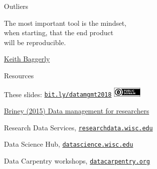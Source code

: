 \documentclass[aspectratio=169,12pt,t]{beamer}
\begin{document}
\begin{frame}[c]{Outliers}


\end{frame}




\begin{frame}[c]{}

\begin{center}
\large
The most important tool is the {\hilit mindset},\\
when starting, that the end product \\
will be reproducible.
\end{center}

\hfill
{\lolit
{\textendash} \href{http://odin.mdacc.tmc.edu/~kabaggerly/}{Keith Baggerly}
}

\end{frame}



\begin{frame}[c]{Resources}

  \bbi
\item These slides: \href{https://bit.ly/datamgmt2018}{\tt bit.ly/datamgmt2018} \quad
\includegraphics[height=5mm]{Figs/cc-zero.png}
\item \href{https://www.amazon.com/gp/product/B019NDNOMA?ie=UTF8&tag=7210-20}{Briney (2015) Data management for researchers}
\item Research Data Services,
  \href{http://researchdata.wisc.edu/}{\tt researchdata.wisc.edu}
\item Data Science Hub,
  \href{https://datascience.wisc.edu/}{\tt datascience.wisc.edu}
\item Data Carpentry workshops,
  \href{https://datacarpentry.org/}{\tt datacarpentry.org}
  \ei

\end{frame}
\end{document}
